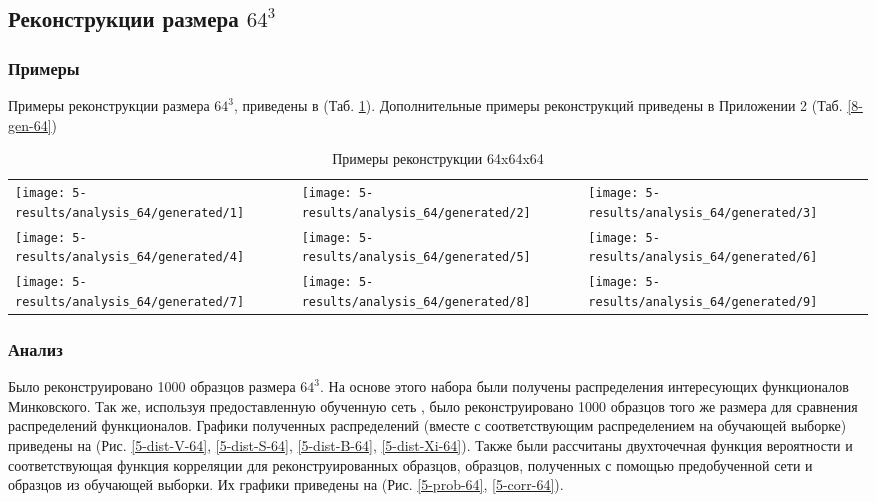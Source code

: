 	
	\subsection{Реконструкции размера $64^3$}
		\subsubsection{Примеры}
			Примеры реконструкции размера $64^3$, приведены в (Таб. \ref{5-gen-64}). Дополнительные примеры реконструкций приведены в Приложении 2 (Таб. \ref{8-gen-64})
			
			\begin{table}[h!]
				\begin{center}
					\begin{tabular}{p{5cm} p{5cm} p{5cm}}
						\toprule
						\texttt{[image: 5-results/analysis\_64/generated/1]}
						&
						\texttt{[image: 5-results/analysis\_64/generated/2]}
						&
						\texttt{[image: 5-results/analysis\_64/generated/3]}
						\\
						\texttt{[image: 5-results/analysis\_64/generated/4]}
						&
						\texttt{[image: 5-results/analysis\_64/generated/5]}
						&
						\texttt{[image: 5-results/analysis\_64/generated/6]}
						\\
						\texttt{[image: 5-results/analysis\_64/generated/7]}
						&
						\texttt{[image: 5-results/analysis\_64/generated/8]}
						&
						\texttt{[image: 5-results/analysis\_64/generated/9]}
						\\
						\bottomrule
					\end{tabular}
					\caption{Примеры реконструкции 64x64x64}
					\label{5-gen-64}
				\end{center}
			\end{table} 
		
		\subsubsection{Анализ}
			Было реконструировано 1000 образцов размера $64^3$. На основе этого набора были получены распределения интересующих функционалов Минковского. Так же, используя предоставленную обученную сеть \cite{Mosser}, было реконструировано 1000 образцов того же размера для сравнения распределений функционалов. Графики полученных распределений (вместе с соответствующим распределением на обучающей выборке) приведены на (Рис. \ref{5-dist-V-64}, \ref{5-dist-S-64}, \ref{5-dist-B-64}, \ref{5-dist-Xi-64}). Также были рассчитаны двухточечная функция вероятности и соответствующая функция корреляции для реконструированных образцов, образцов, полученных с помощью предобученной сети \cite{Mosser} и образцов из обучающей выборки. Их графики приведены на (Рис. \ref{5-prob-64}, \ref{5-corr-64}).
			
